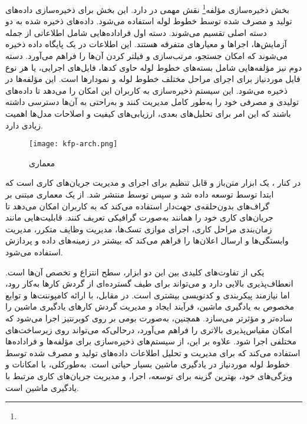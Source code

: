بخش ذخیره‌سازی مؤلفه\footnote{} نقش مهمی در  دارد. این بخش برای ذخیره‌سازی داده‌های تولید و مصرف شده توسط خطوط لوله استفاده می‌شود. داده‌های ذخیره شده به دو دسته اصلی تقسیم می‌شوند. دسته اول فراداده‌هایی شامل اطلاعاتی از جمله آزمایش‌ها، اجراها و معیارهای متفرقه هستند. این اطلاعات در یک پایگاه داده  ذخیره می‌شوند که امکان جستجو، مرتب‌سازی و فیلتر کردن آن‌ها را فراهم می‌آورد. دسته دوم نیز مؤلفه‌هایی شامل بسته‌های خطوط لوله حاوی کدها، فایل‌های اجرایی، یا هر نوع فایل موردنیاز برای اجرای مراحل مختلف خطوط لوله و نمودارها است. این مؤلفه‌ها در  ذخیره می‌شود. این سیستم ذخیره‌سازی به کاربران این امکان را می‌دهد تا داده‌های تولیدی و مصرفی خود را به‌طور کامل مدیریت کنند و به‌راحتی به آن‌ها دسترسی داشته باشند که این امر برای تحلیل‌های بعدی، ارزیابی‌های کیفیت و اصلاحات مدل‌ها اهمیت زیادی دارد.

\begin{figure}[t]
	\centering
	\texttt{[image: kfp-arch.png]}
	\caption{معماری }
	\label{fig: kfp arch}
\end{figure}

در کنار ،  یک ابزار متن‌باز و قابل تنظیم برای اجرای و مدیریت جریان‌های کاری است که ابتدا توسط  توسعه داده شد و سپس توسط  منتشر شد.  از یک معماری مبتنی بر گراف‌های بدون‌حلقه‌ی جهت‌دار استفاده می‌کند که به کاربران امکان می‌دهد تا جریان‌های کاری خود را همانند  به‌صورت گرافیکی تعریف کنند.  قابلیت‌هایی مانند زمان‌بندی مراحل کاری، اجرای موازی تسک‌ها، مدیریت وظایف متکرر، مدیریت وابستگی‌ها و ارسال اعلان‌ها را فراهم می‌کند که بیشتر در زمینه‌های داده و پردازش  استفاده می‌شود.

یکی از تفاوت‌های کلیدی بین این دو ابزار، سطح انتزاع و تخصص آن‌ها است.  انعطاف‌پذیری بالایی دارد و می‌تواند برای طیف گسترده‌ای از گردش کارها به‌کار رود، اما نیازمند پیکربندی و کدنویسی بیشتری است. در مقابل،  با ارائه کامپوننت‌ها و توابع مخصوص به یادگیری ماشین، فرآیند ایجاد و مدیریت گردش کارهای یادگیری ماشین را ساده‌تر و مؤثرتر می‌سازد. همچنین،  به‌صورت بومی بر روی کوبرنتیز اجرا می‌شود که امکان مقیاس‌پذیری بالاتری را فراهم می‌آورد، درحالی‌که  می‌تواند روی زیرساخت‌های مختلفی اجرا شود. علاوه بر این،  از سیستم‌های ذخیره‌سازی برای مؤلفه‌ها و فراداده‌ها استفاده می‌کند که برای مدیریت و تحلیل اطلاعات داده‌های تولید و مصرف شده توسط خطوط لوله موردنیاز در یادگیری ماشین بسیار حیاتی است. به‌طورکلی،  با امکانات و ویژگی‌های خود، بهترین گزینه برای توسعه، اجرا، و مدیریت جریان‌های کاری مرتبط با یادگیری ماشین است.


